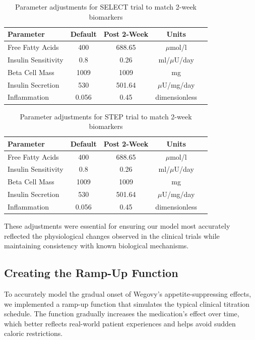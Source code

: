 \begin{table}[h]
\centering
\begin{tabular}{|l|c|c|c|c|}
\hline
\textbf{Parameter} & \textbf{Default} & \textbf{Post 2-Week} & \textbf{Units} \\
\hline
Free Fatty Acids & 400 & 688.65 & $\mu$mol/l \\
Insulin Sensitivity & 0.8 & 0.26 & ml/$\mu$U/day \\
Beta Cell Mass & 1009 & 1009 & mg \\
Insulin Secretion & 530 & 501.64 & $\mu$U/mg/day \\
Inflammation & 0.056 & 0.45 & dimensionless \\
\hline
\end{tabular}
\caption{Parameter adjustments for SELECT trial to match 2-week biomarkers}
\end{table}

\begin{table}[!h]
\centering
\begin{tabular}{|l|c|c|c|c|}
\hline
\textbf{Parameter} & \textbf{Default} & \textbf{Post 2-Week} & \textbf{Units} \\
\hline
Free Fatty Acids & 400 & 688.65 & $\mu$mol/l \\
Insulin Sensitivity & 0.8 & 0.26 & ml/$\mu$U/day \\
Beta Cell Mass & 1009 & 1009 & mg \\
Insulin Secretion & 530 & 501.64 & $\mu$U/mg/day \\
Inflammation & 0.056 & 0.45 & dimensionless \\
\hline
\end{tabular}
\caption{Parameter adjustments for STEP trial to match 2-week biomarkers}
\end{table}

These adjustments were essential for ensuring our model most accurately reflected the physiological changes observed in the clinical trials while maintaining consistency with known biological mechanisms.

\subsection{Creating the Ramp-Up Function}
To accurately model the gradual onset of Wegovy's appetite-suppressing effects, we implemented a ramp-up function that simulates the typical clinical titration schedule. The function gradually increases the medication's effect over time, which better reflects real-world patient experiences and helps avoid sudden caloric restrictions.

